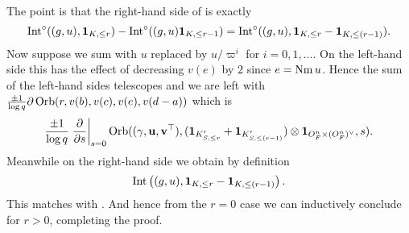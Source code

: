 The point is that the right-hand side of  is exactly
\[ \operatorname{Int}^\circ((g,u), \mathbf{1}_{K, \le r}) - \operatorname{Int}^\circ((g,u) \mathbf{1}_{K, \le r-1})
  = \operatorname{Int}^\circ((g,u), \mathbf{1}_{K, \le r} - \mathbf{1}_{K, \le (r-1)}). \]
Now suppose we sum  with $u$ replaced by
$u/\varpi^i$ for $i = 0, 1, \dots$.
On the left-hand side this has the effect of decreasing $v(e)$ by $2$ since $e = \operatorname{Nm} u$.
Hence the sum of the left-hand sides telescopes and we are left with
$\frac{\pm1}{\log q}\partial\operatorname{Orb}(r, v(b), v(c), v(e), v(d-a))$
which is
\[ \frac{\pm 1}{\log q}\left. \pdv{}{s} \right\rvert_{s=0}
  \operatorname{Orb}({(\gamma, \mathbf u, \mathbf v^\top)}, (\mathbf{1}_{K'_{S, \le r}} + \mathbf{1}_{K'_{S, \le (r-1)}}) \otimes \mathbf{1}_{O_F^n \times (O_F^n)^\vee}, s). \]
Meanwhile on the right-hand side we obtain by definition
\[ \operatorname{Int}\left((g,u), \mathbf{1}_{K, \le r} - \mathbf{1}_{K, \le (r-1)}\right). \]
This matches with .
And hence from the $r = 0$ case we can inductively conclude
 for $r > 0$, completing the proof.
